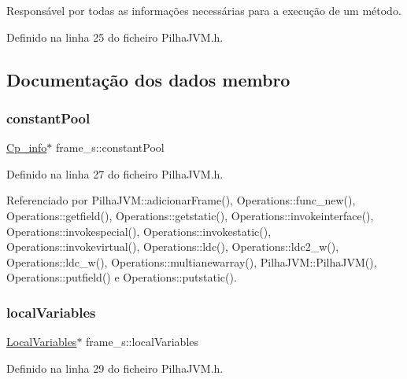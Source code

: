 Responsável por todas as informações necessárias para a execução de um método. 

Definido na linha 25 do ficheiro Pilha\+J\+V\+M.\+h.



\subsection{Documentação dos dados membro}
\mbox{\label{structframe__s_a87635828c425af2fef349dd22400fe99}} 
\subsubsection{\texorpdfstring{constant\+Pool}{constantPool}}
{\footnotesize\ttfamily \hyperlink{structCp__info}{Cp\+\_\+info}$\ast$ frame\+\_\+s\+::constant\+Pool}



Definido na linha 27 do ficheiro Pilha\+J\+V\+M.\+h.



Referenciado por Pilha\+J\+V\+M\+::adicionar\+Frame(), Operations\+::func\+\_\+new(), Operations\+::getfield(), Operations\+::getstatic(), Operations\+::invokeinterface(), Operations\+::invokespecial(), Operations\+::invokestatic(), Operations\+::invokevirtual(), Operations\+::ldc(), Operations\+::ldc2\+\_\+w(), Operations\+::ldc\+\_\+w(), Operations\+::multianewarray(), Pilha\+J\+V\+M\+::\+Pilha\+J\+V\+M(), Operations\+::putfield() e Operations\+::putstatic().

\mbox{\label{structframe__s_ab8c8d556e0b3a59ce604754a0e3634bb}} 
\subsubsection{\texorpdfstring{local\+Variables}{localVariables}}
{\footnotesize\ttfamily \hyperlink{classLocalVariables}{Local\+Variables}$\ast$ frame\+\_\+s\+::local\+Variables}



Definido na linha 29 do ficheiro Pilha\+J\+V\+M.\+h.



